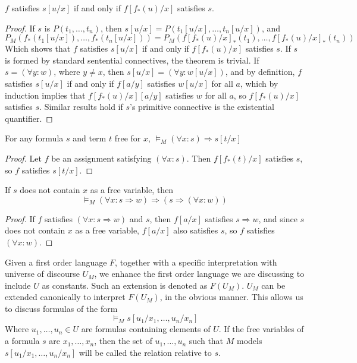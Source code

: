 \begin{lemma}
    $f$ satisfies $s[u/x]$ if and only if $f[f_*(u)/x]$ satisfies $s$.
\end{lemma}
\begin{proof}
    If $s$ is $P(t_1, \dots, t_n)$, then $s[u/x] = P(t_1[u/x], \dots, t_n[u/x])$, and
    \[ P_M(f_*(t_1[u/x]), \dots, f_*(t_n[u/x])) = P_M(f[f_*(u)/x]_*(t_1), \dots, f[f_*(u)/x]_*(t_n)) \]
    Which shows that $f$ satisfies $s[u/x]$ if and only if $f[f_*(u)/x]$ satisfies $s$. If $s$ is formed by standard sentential connectives, the theorem is trivial. If $s = (\forall y: w)$, where $y \neq x$, then $s[u/x] = (\forall y: w[u/x])$, and by definition, $f$ satisfies $s[u/x]$ if and only if $f[a/y]$ satisfies $w[u/x]$ for all $a$, which by induction implies that $f[f_*(u)/x][a/y]$ satisfies $w$ for all $a$, so $f[f_*(u)/x]$ satisfies $s$. Similar results hold if $s$'s primitive connective is the existential quantifier.
\end{proof}

\begin{theorem}
    For any formula $s$ and term $t$ free for $x$, $\vDash_M (\forall x : s) \Rightarrow s[t/x]$
\end{theorem}
\begin{proof}
    Let $f$ be an assignment satisfying $(\forall x: s)$. Then $f[f_*(t)/x]$ satisfies $s$, so $f$ satisfies $s[t/x]$.
\end{proof}

\begin{theorem}
    If $s$ does not contain $x$ as a free variable, then
    \[ \vDash_M (\forall x: s \Rightarrow w) \Rightarrow (s \Rightarrow (\forall x: w)) \]
\end{theorem}
\begin{proof}
    If $f$ satisfies $(\forall x: s \Rightarrow w)$ and $s$, then $f[a/x]$ satisfies $s \Rightarrow w$, and since $s$ does not contain $x$ as a free variable, $f[a/x]$ also satisfies $s$, so $f$ satisfies $(\forall x : w)$.
\end{proof}

Given a first order language $F$, together with a specific interpretation with universe of discourse $U_M$, we enhance the first order language we are discussing to include $U$ as constants. Such an extension is denoted as $F(U_M)$. $U_M$ can be extended canonically to interpret $F(U_M)$, in the obvious manner. This allows us to discuss formulas of the form
%
\[ \vDash_M s[u_1/x_1, \dots, u_n/x_n] \]
%
Where $u_1, \dots, u_n \in U$ are formulas containing elements of $U$. If the free variables of a formula $s$ are $x_1, \dots, x_n$, then the set of $u_1, \dots, u_n$ such that $M$ models $s[u_1/x_1, \dots, u_n/x_n]$ will be called the relation relative to $s$.

